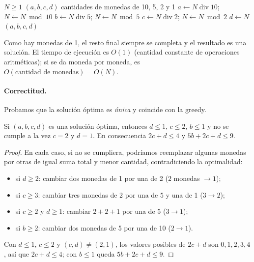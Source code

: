 \begin{algorithm}[H]
\caption{Cambio greedy con monedas de 10, 5, 2 y 1}
\begin{algorithmic}[1]
\Require $N\ge 1$
\Ensure $(a,b,c,d)$ cantidades de monedas de 10, 5, 2 y 1
\State $a\gets N \operatorname{div} 10$; \quad $N\gets N \bmod 10$
\State $b\gets N \operatorname{div} 5$; \quad $N\gets N \bmod 5$
\State $c\gets N \operatorname{div} 2$; \quad $N\gets N \bmod 2$
\State $d\gets N$
\State \Return $(a,b,c,d)$
\end{algorithmic}
\end{algorithm}
Como hay monedas de 1, el resto final siempre se completa y el resultado es una solución. El
tiempo de ejecución es $O(1)$ (cantidad constante de operaciones aritméticas); si se da moneda
por moneda, es $O(\text{cantidad de monedas})=O(N)$.

\paragraph{Correctitud.} Probamos que la solución óptima es \emph{única} y coincide con la
greedy.

\begin{lema}\label{lem:monedas}
Si $(a,b,c,d)$ es una solución óptima, entonces $d\le 1$, $c\le 2$, $b\le 1$ y no se cumple a
la vez $c=2$ y $d=1$. En consecuencia $2c+d\le 4$ y $5b+2c+d\le 9$.
\end{lema}
\begin{proof}
En cada caso, si no se cumpliera, podríamos reemplazar algunas monedas por otras de igual
suma total y menor cantidad, contradiciendo la optimalidad:
\begin{itemize}
  \item si $d\ge2$: cambiar dos monedas de 1 por una de 2 ($2$ monedas $\to 1$);
  \item si $c\ge3$: cambiar tres monedas de 2 por una de 5 y una de 1 ($3\to 2$);
  \item si $c\ge2$ y $d\ge1$: cambiar $2+2+1$ por una de 5 ($3\to1$);
  \item si $b\ge2$: cambiar dos monedas de 5 por una de 10 ($2\to1$).
\end{itemize}
Con $d\le1$, $c\le2$ y $(c,d)\ne(2,1)$, los valores posibles de $2c+d$ son $0,1,2,3,4$, así que
$2c+d\le4$; con $b\le1$ queda $5b+2c+d\le 9$.
\end{proof}

